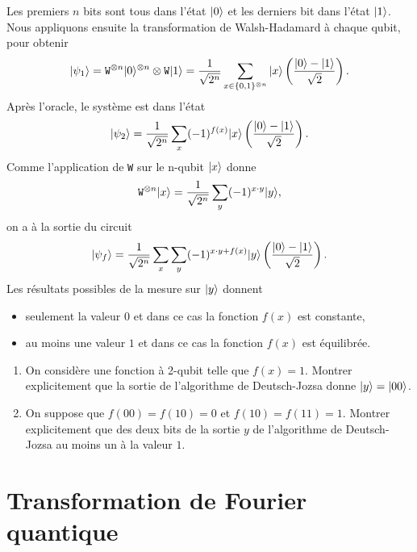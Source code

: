 Les premiers $n$ bits sont tous dans l'état $\vert0\rangle$ et les derniers bit dans
l'état $\vert1\rangle$. Nous appliquons ensuite la transformation de Walsh-Hadamard à
chaque qubit, pour obtenir 
\begin{equation}
\vert\psi_1\rangle =\mathtt{W}^{\otimes n}\vert0\rangle^{\otimes n}\otimes\mathtt{W}
\vert1\rangle =\frac{1}{\sqrt{2^n}}\sum_{x\in\{0,1\}^{\otimes n}}\vert x\rangle
\left(\frac{\vert0\rangle-\vert1\rangle}{\sqrt{2}}\right). 
\end{equation}
Après l'oracle, le système est dans l'état
\begin{equation}
\vert\psi_2\rangle =\frac{1}{\sqrt{2^n}}\sum_x(-1)^{f(x)}\vert x\rangle \left(\frac{\vert0\rangle-
\vert1\rangle}{\sqrt{2}}\right).
\end{equation} 
Comme l'application de \texttt{W} sur le n-qubit $\vert x\rangle$ donne
\begin{equation}
 \mathtt{W}^{\otimes n}\vert x\rangle=\frac{1}{\sqrt{2^n}}\sum_y(-1)^{x\cdot y}\vert y\rangle,
\end{equation} 
on a à la sortie du circuit
\begin{equation}
\vert\psi_f\rangle =\frac{1}{\sqrt{2^n}}\sum_x\sum_y(-1)^{x\cdot y+f(x)}\vert y\rangle
\left(\frac{\vert0\rangle-\vert1\rangle}{\sqrt{2}}\right).
\end{equation} 
Les résultats possibles de la mesure sur $\vert y\rangle$ donnent
\begin{itemize}
 \item seulement la valeur $0$ et dans ce cas la fonction $f(x)$ est constante,
 \item au moins une valeur $1$ et dans ce cas la fonction $f(x)$ est équilibrée.
\end{itemize}

\begin{exercise}
\begin{enumerate}
\item On considère une fonction à 2-qubit telle que $f(x)=1$. Montrer
explicitement que la sortie de l'algorithme de Deutsch-Jozsa donne
$\vert y\rangle=\vert00\rangle$.

\item On suppose que $f(00)=f(10)=0$ et $f(10)=f(11)=1$. Montrer
explicitement que des deux bits de la sortie $y$ de l'algorithme de
Deutsch-Jozsa au moins un à la valeur $1$.
\end{enumerate}

\end{exercise}

\section{Transformation de Fourier quantique}

